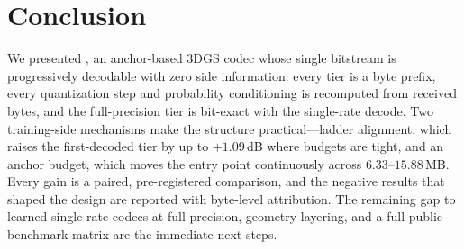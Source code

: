 \section{Conclusion}
\label{sec:conclusion}

We presented \DCCA, an anchor-based 3DGS codec whose single bitstream is progressively decodable with zero side information: every tier is a byte prefix, every quantization step and probability conditioning is recomputed from received bytes, and the full-precision tier is bit-exact with the single-rate decode.
Two training-side mechanisms make the structure practical---ladder alignment, which raises the first-decoded tier by up to $+1.09$\,dB where budgets are tight, and an anchor budget, which moves the entry point continuously across $6.33$--$15.88$\,MB.
Every gain is a paired, pre-registered comparison, and the negative results that shaped the design are reported with byte-level attribution.
The remaining gap to learned single-rate codecs at full precision, geometry layering, and a full public-benchmark matrix are the immediate next steps.
